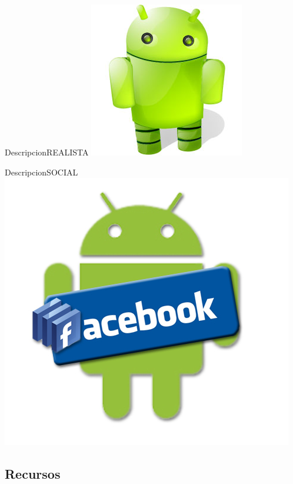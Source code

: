 \documentclass{beamer}
\begin{document}
\begin{frame}{Descripcion}{REALISTA}
   \includegraphics[scale=0.5]{droid.jpg}
\end{frame}

\begin{frame}{Descripcion}{SOCIAL}
\vspace{0.2in}\includegraphics[scale=0.45]{fb.jpg}
\end{frame}




\subsection{Recursos}
\end{document}
